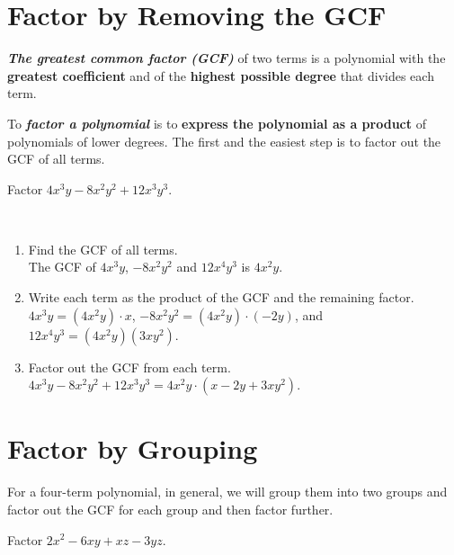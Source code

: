 \documentclass[
  en,11pt]{elegantbook}
\let\BeginKnitrBlock\begin \let\EndKnitrBlock\end
\begin{document}
\hypertarget{factor-by-removing-the-gcf}{%
\section{Factor by Removing the GCF}\label{factor-by-removing-the-gcf}}

\textbf{\emph{The greatest common factor (GCF)}} of two terms is a polynomial with the \textbf{greatest coefficient} and of the \textbf{highest possible degree} that divides each term.

To \textbf{\emph{factor a polynomial}} is to \textbf{express the polynomial as a product} of polynomials of lower degrees. The first and the easiest step is to factor out the GCF of all terms.

\BeginKnitrBlock{example}
\protect\hypertarget{exm:unnamed-chunk-9}{}{\label{exm:unnamed-chunk-9} }
Factor \(4x^3y-8x^2y^2+12x^3y^3\).
\EndKnitrBlock{example}

\BeginKnitrBlock{solution}
{}~

\begin{enumerate}
\def\labelenumi{\arabic{enumi}.}

\item
  Find the GCF of all terms.\\
  The GCF of \(4x^3y\), \(-8x^2y^2\) and \(12x^4y^3\) is \(4x^2y\).
\item
  Write each term as the product of the GCF and the remaining factor.\\
  \(4x^3y=(4x^2y)\cdot x\), \(-8x^2y^2=(4x^2y)\cdot (-2y)\), and \(12x^4y^3=(4x^2y)(3xy^2)\).
\item
  Factor out the GCF from each term.\\
  \(4x^3y-8x^2y^2+12x^3y^3=4x^2y\cdot(x-2y+3xy^2)\).
\end{enumerate}
\EndKnitrBlock{solution}

\hypertarget{factor-by-grouping}{%
\section{Factor by Grouping}\label{factor-by-grouping}}

For a four-term polynomial, in general, we will group them into two groups and factor out the GCF for each group and then factor further.

\BeginKnitrBlock{example}
\protect\hypertarget{exm:unnamed-chunk-11}{}{\label{exm:unnamed-chunk-11} }
Factor \(2x^2-6xy+xz-3yz\).
\EndKnitrBlock{example}
\end{document}

